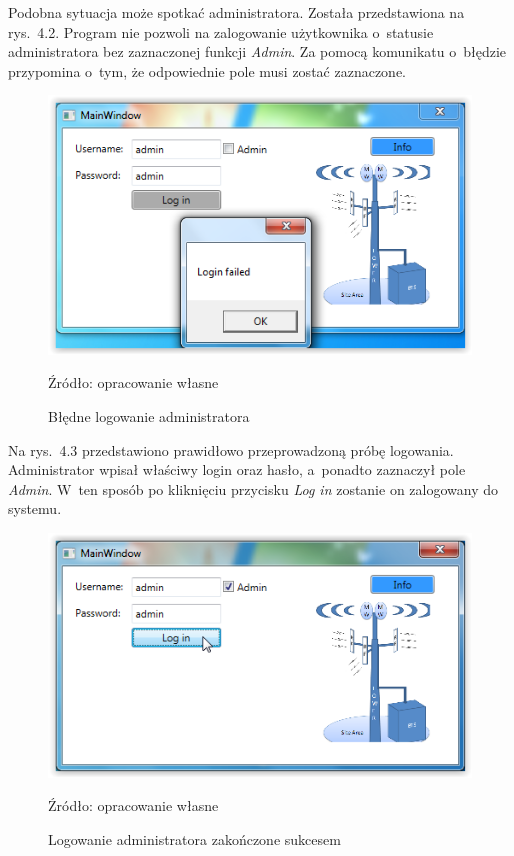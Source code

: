 \documentclass[12pt,a4paper]{report}
\begin{document}
Podobna sytuacja może spotkać administratora. Została przedstawiona na rys.~4.2. Program nie pozwoli na zalogowanie użytkownika o~statusie administratora bez zaznaczonej funkcji \textit{Admin}. Za pomocą komunikatu o~błędzie przypomina o~tym, że odpowiednie pole musi zostać zaznaczone.

\begin{figure}[!bht]
\centering
\includegraphics[scale=1]{Pictures/LoginFailedAdmin.png}
\label{fig: LoginFailedAdmin}
\caption{Błędne logowanie administratora}{Źródło: opracowanie własne}
\end{figure}
\newpage
Na rys.~4.3 przedstawiono prawidłowo przeprowadzoną próbę logowania. Administrator wpisał właściwy login oraz hasło, a~ponadto zaznaczył pole \textit{Admin}. W~ten sposób po kliknięciu przycisku \textit{Log in} zostanie on zalogowany do systemu.

\begin{figure}[!bht]
\centering
\includegraphics[scale=1]{Pictures/LoginAcceptAdmin.png}
\label{fig: LoginAcceptAdmin}
\caption{Logowanie administratora zakończone sukcesem}{Źródło: opracowanie własne}
\end{figure}
\end{document}
